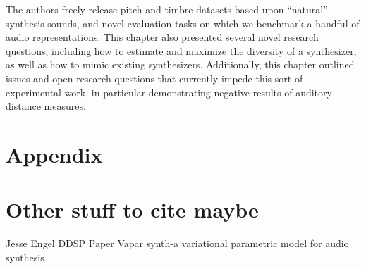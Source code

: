 The authors freely release pitch and timbre datasets based upon ``natural'' synthesis sounds, and novel evaluation tasks on which we benchmark a handful of audio representations. This chapter also presented several novel research questions, including how to estimate and maximize the diversity of a synthesizer, as well as how to mimic existing synthesizers. Additionally, this chapter outlined issues and open research questions that currently impede this sort of experimental work, in particular demonstrating negative results of auditory distance measures.

%
%

\iffalse
\section{Appendix}

\section{Other stuff to cite maybe}








Jesse Engel DDSP Paper \cite{engel2020ddsp}
Vapar synth-a variational parametric model for audio synthesis \cite{subramani2020vapar}

